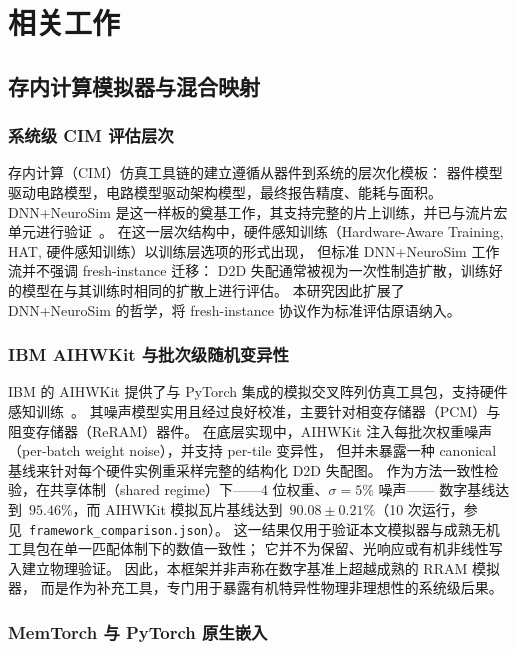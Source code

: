 \chapter{相关工作}
\label{chap:related-work}

\section{存内计算模拟器与混合映射}

\subsection{系统级 CIM 评估层次}

存内计算（CIM）仿真工具链的建立遵循从器件到系统的层次化模板：
器件模型驱动电路模型，电路模型驱动架构模型，最终报告精度、能耗与面积。
DNN+NeuroSim 是这一样板的奠基工作，其支持完整的片上训练，并已与流片宏单元进行验证~\parencite{peng2020dnnneurosim}。
在这一层次结构中，硬件感知训练（Hardware-Aware Training, HAT, 硬件感知训练）以训练层选项的形式出现，
但标准 DNN+NeuroSim 工作流并不强调 fresh-instance 迁移：
D2D 失配通常被视为一次性制造扩散，训练好的模型在与其训练时相同的扩散上进行评估。
本研究因此扩展了 DNN+NeuroSim 的哲学，将 fresh-instance 协议作为标准评估原语纳入。

\subsection{IBM AIHWKit 与批次级随机变异性}

IBM 的 AIHWKit 提供了与 PyTorch 集成的模拟交叉阵列仿真工具包，支持硬件感知训练~\parencite{rasch2021aihwkit}。
其噪声模型实用且经过良好校准，主要针对相变存储器（PCM）与阻变存储器（ReRAM）器件。
在底层实现中，AIHWKit 注入每批次权重噪声（per-batch weight noise），并支持 per-tile 变异性，
但并未暴露一种 canonical 基线来针对每个硬件实例重采样完整的结构化 D2D 失配图。
作为方法一致性检验，在共享体制（shared regime）下——4 位权重、$\sigma=5\%$ 噪声——
数字基线达到~$95.46\%$，而 AIHWKit 模拟瓦片基线达到~$90.08\pm0.21\%$（10 次运行，参见~\texttt{framework\_comparison.json}）。
这一结果仅用于验证本文模拟器与成熟无机工具包在单一匹配体制下的数值一致性；
它并不为保留、光响应或有机非线性写入建立物理验证。
因此，本框架并非声称在数字基准上超越成熟的 RRAM 模拟器，
而是作为补充工具，专门用于暴露有机特异性物理非理想性的系统级后果。

\subsection{MemTorch 与 PyTorch 原生嵌入}


